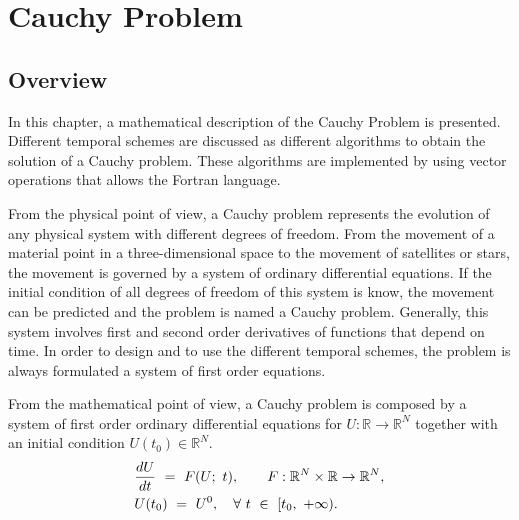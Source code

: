 
    
\chapter{Cauchy Problem  }\label{Dev:Cauchy_Problem}
\section{Overview}
    
In this chapter,  a mathematical description of the Cauchy Problem is presented. Different temporal schemes are discussed as different algorithms to obtain the solution of a Cauchy problem. These algorithms are implemented by using vector operations 
that allows the Fortran language. 
    
From the physical point of view, a Cauchy problem represents the evolution of any physical system with different degrees of freedom. From the movement of a material point in a three-dimensional space to the movement of satellites or stars, the movement is governed by  a system  of ordinary differential equations. If the initial condition of all degrees of freedom of this system is know, the movement can be predicted and the problem is named a Cauchy problem. Generally, this system involves first and second order derivatives of functions that depend on time. In order to design and to use the different temporal schemes, the problem is always  formulated  a system of first order equations. 
          
From the mathematical point of view, a Cauchy problem is composed by a  system of first order ordinary differential equations for
$U: \mathbb{ R} \rightarrow \mathbb{ R}^N$ together with an initial condition  $U (t_0) \in \mathbb{ R}^N$. 
 \begin{align}
 &  \frac{d U}{d t} \ = \ F (U; \ t) ,  \qquad F : \mathbb{R}^N \times \mathbb{R} \rightarrow \mathbb{R}^N , \label{Cauchy_problem} \\ 
 \displaystyle  
 & U (t_0) \ = \ U^0 , \quad \forall \ t \ \in \ [ t_0, \ + \infty ) .
 \end{align}


    
       
